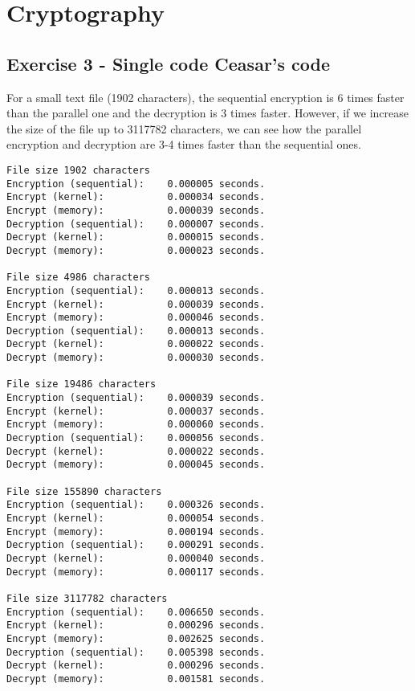 \documentclass[a4paper]{article}
\begin{document}
\section{Cryptography}

\subsection{Exercise 3 - Single code Ceasar's code}

For a small text file (1902 characters), the sequential encryption is 6 times faster than the parallel one and the decryption is 3 times faster. However, if we increase the size of the file up to 3117782 characters, we can see how the parallel encryption and decryption are 3-4 times faster than the sequential ones.

\begin{verbatim}
File size 1902 characters
Encryption (sequential):    0.000005 seconds.
Encrypt (kernel):           0.000034 seconds.
Encrypt (memory):           0.000039 seconds.
Decryption (sequential):    0.000007 seconds.
Decrypt (kernel):           0.000015 seconds.
Decrypt (memory):           0.000023 seconds.

File size 4986 characters
Encryption (sequential):    0.000013 seconds.
Encrypt (kernel):           0.000039 seconds.
Encrypt (memory):           0.000046 seconds.
Decryption (sequential):    0.000013 seconds.
Decrypt (kernel):           0.000022 seconds.
Decrypt (memory):           0.000030 seconds.

File size 19486 characters
Encryption (sequential):    0.000039 seconds.
Encrypt (kernel):           0.000037 seconds.
Encrypt (memory):           0.000060 seconds.
Decryption (sequential):    0.000056 seconds.
Decrypt (kernel):           0.000022 seconds.
Decrypt (memory):           0.000045 seconds.

File size 155890 characters
Encryption (sequential):    0.000326 seconds.
Encrypt (kernel):           0.000054 seconds.
Encrypt (memory):           0.000194 seconds.
Decryption (sequential):    0.000291 seconds.
Decrypt (kernel):           0.000040 seconds.
Decrypt (memory):           0.000117 seconds.

File size 3117782 characters
Encryption (sequential):    0.006650 seconds.
Encrypt (kernel):           0.000296 seconds.
Encrypt (memory):           0.002625 seconds.
Decryption (sequential):    0.005398 seconds.
Decrypt (kernel):           0.000296 seconds.
Decrypt (memory):           0.001581 seconds.
\end{verbatim}
\end{document}
